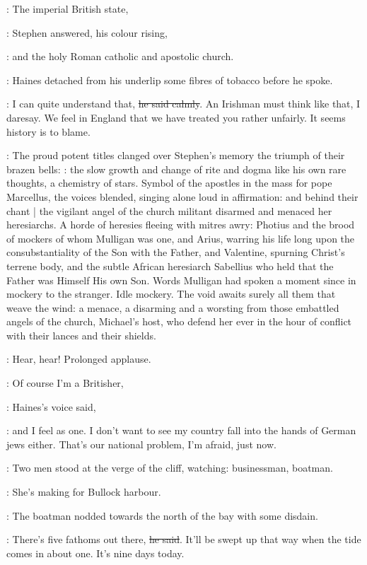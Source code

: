 \Stephen:
The imperial British state,

:
Stephen answered, his colour rising,

\Stephen:
and the holy Roman catholic and apostolic church.

:
Haines detached from his underlip some fibres of tobacco
before he spoke.

\Haines:
I can quite understand that,
\sout{he said calmly}.
An Irishman must think like that, I daresay.
We feel in England that we have treated you rather unfairly.
It seems history is to blame.

:
The proud potent titles clanged over Stephen's memory
the triumph of their brazen bells:
\/:
the slow growth and change of rite and dogma
like his own rare thoughts, a chemistry of stars.
Symbol of the apostles in the mass for pope Marcellus,
the voices blended, singing alone loud in affirmation:
and behind their chant |
the vigilant angel of the church militant
disarmed and menaced her heresiarchs.
A horde of heresies fleeing with mitres awry:
Photius and the brood of mockers of whom Mulligan was one,
and Arius, warring his life long
upon the consubstantiality of the Son with the Father,
and Valentine, spurning Christ's terrene body,
and the subtle African heresiarch Sabellius
who held that the Father was Himself His own Son.
Words Mulligan had spoken a moment since in mockery to the stranger.
Idle mockery.
The void awaits surely all them that weave the wind:
a menace, a disarming
and a worsting from those embattled angels of the church,
Michael's host, who defend her ever
in the hour of conflict with their lances and their shields.

\StephenInt:
Hear, hear!
Prolonged applause.

\Haines:
Of course I'm a Britisher,

:
Haines's voice said,

\Haines:
and I feel as one.
I don't want to see my country fall into the hands of German jews either.
That's our national problem, I'm afraid, just now.

:
Two men stood at the verge of the cliff, watching:
businessman, boatman.

\Businessman:
She's making for Bullock harbour.

:
The boatman nodded towards the north of the bay with some disdain.

\Boatman:
There's five fathoms out there,
\sout{he said}.
It'll be swept up that way when the tide comes in about one.
It's nine days today.

